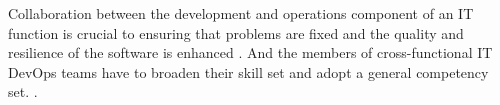 Collaboration between the development and operations component of an IT function is crucial to ensuring that problems are fixed and the quality and resilience of the software is enhanced \cite{aw_2019}. And the members of cross-functional IT DevOps teams have to broaden their skill set and adopt a general competency set. \cite{aw_2019}.









